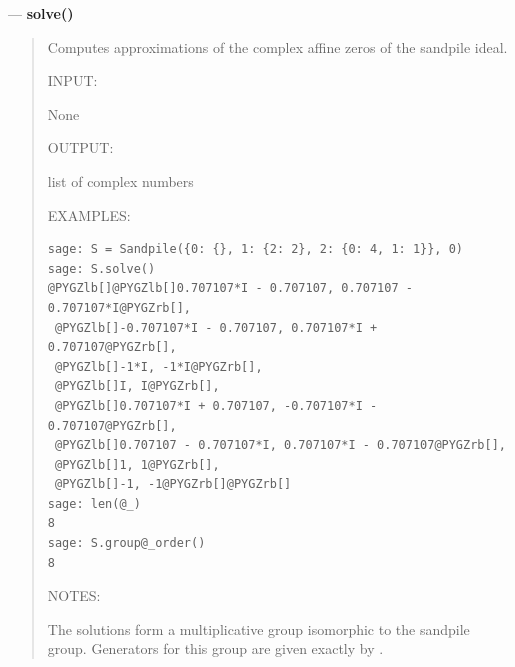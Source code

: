 \documentclass[letterpaper,10pt,english]{manual}
\begin{document}
---
\hypertarget{solve}{}
\textbf{solve()}
\begin{quote}

Computes approximations of the complex affine zeros of the sandpile
ideal.

INPUT:

None

OUTPUT:

list of complex numbers

EXAMPLES:

\begin{Verbatim}[commandchars=@\[\]]
sage: S = Sandpile({0: {}, 1: {2: 2}, 2: {0: 4, 1: 1}}, 0)
sage: S.solve()
@PYGZlb[]@PYGZlb[]0.707107*I - 0.707107, 0.707107 - 0.707107*I@PYGZrb[],
 @PYGZlb[]-0.707107*I - 0.707107, 0.707107*I + 0.707107@PYGZrb[],
 @PYGZlb[]-1*I, -1*I@PYGZrb[],
 @PYGZlb[]I, I@PYGZrb[],
 @PYGZlb[]0.707107*I + 0.707107, -0.707107*I - 0.707107@PYGZrb[],
 @PYGZlb[]0.707107 - 0.707107*I, 0.707107*I - 0.707107@PYGZrb[],
 @PYGZlb[]1, 1@PYGZrb[],
 @PYGZlb[]-1, -1@PYGZrb[]@PYGZrb[]
sage: len(@_)
8
sage: S.group@_order()
8
\end{Verbatim}

NOTES:

The solutions form a multiplicative group isomorphic to the sandpile
group.  Generators for this group are given exactly by .
\end{quote}
\end{document}

